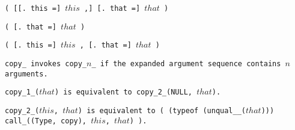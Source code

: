 
\s\s\s\tt{(} [[\tt{. this =}]
$this$ \tt{,}] [\tt{. that =}] $that$ \tt{)}

\s\tt{(} \phantom{[}[\tt{. that =}] $that$ \tt{)}

\s\tt{(} \phantom{[}[\tt{. this =}]
$this$ \tt{,}\phantom{]}  [\tt{. that =}] $that$ \tt{)}


\tt{copy_} invokes \tt{copy_}$n$\_ if the expanded
argument sequence contains $n$ arguments.

\tt{copy_1_(}$that$\tt{)} is equivalent to \tt{copy_2_(NULL,} $that$\tt{)}.

\tt{copy_2_(}$this$\tt{,} $that$\tt{)} is equivalent to \tt{( (typeof
(unqual__(}$that$\tt{))) call_((Type, copy),} $this$\tt{,} $that$\tt{) )}.
